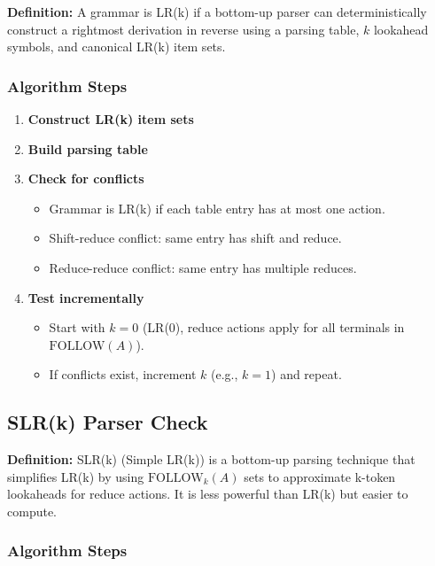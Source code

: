 \textbf{Definition:} A grammar is LR(k) if a bottom-up parser can deterministically construct a rightmost derivation in reverse using a parsing table, $k$ lookahead symbols, and canonical LR(k) item sets.

\subsubsection{Algorithm Steps}

\begin{enumerate}
    \item \textbf{Construct LR(k) item sets}

    \item \textbf{Build parsing table}

    \item \textbf{Check for conflicts}
    \begin{itemize}
        \item Grammar is LR(k) if each table entry has at most one action.
        \item Shift-reduce conflict: same entry has shift and reduce.
        \item Reduce-reduce conflict: same entry has multiple reduces.
    \end{itemize}

    \item \textbf{Test incrementally}
    \begin{itemize}
        \item Start with $k=0$ (LR(0), reduce actions apply for all terminals in $\text{FOLLOW}(A)$).
        \item If conflicts exist, increment $k$ (e.g., $k=1$) and repeat.
    \end{itemize}
\end{enumerate}


\subsection{SLR(k) Parser Check}

\textbf{Definition:} SLR(k) (Simple LR(k)) is a bottom-up parsing technique that simplifies LR(k) by using $\text{FOLLOW}_k(A)$ sets to approximate k-token lookaheads for reduce actions. It is less powerful than LR(k) but easier to compute.

\subsubsection{Algorithm Steps}

